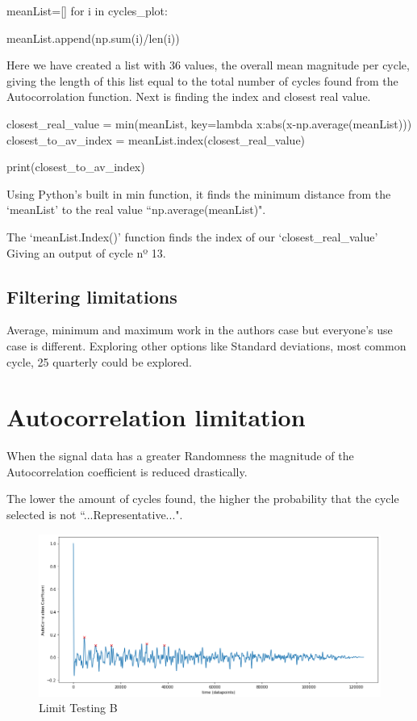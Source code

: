 \begin{python}
meanList=[]
for i in cycles_plot:

    meanList.append(np.sum(i)/len(i))
\end{python}

Here we have created a list with 36 values, the overall mean magnitude per cycle, giving the length of this list equal to the total number of cycles found from the Autocorrolation function. 
Next is finding the index and closest real value. 
\begin{python}
closest_real_value = min(meanList, key=lambda x:abs(x-np.average(meanList)))
closest_to_av_index = meanList.index(closest_real_value)

print(closest_to_av_index)
\end{python}

Using Python's built in min function, it finds the minimum distance from the `meanList' to the real value ``np.average(meanList)". \cite{realValue}

The `meanList.Index()' function finds the index of our  `closest\_real\_value' Giving an output of cycle nº 13.

\subsection{Filtering limitations}
Average, minimum and maximum work in the authors case but everyone's use case is different. Exploring other options like Standard deviations, most common cycle, 25 quarterly could be explored. 
\section{Autocorrelation limitation}\label{limitation}

When the signal data has a greater Randomness the magnitude of the Autocorrelation coefficient is reduced drastically. 

The lower the amount of cycles found, the higher the probability that the cycle selected is not ``...Representative...". 

\begin{figure}[ht]
\centering
\includegraphics[scale=0.40]{images/autocorrolationBadCoefficentWithPeaks.png}
\caption{Limit Testing B}
\label{LimitA}
\end{figure}

